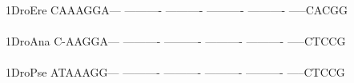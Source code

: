 \documentclass[11pt,twoside,reqno,a4paper]{article}
\begin{document}
{\hspace*{4\charwidth}\hspace*{7\charwidth}\hspace*{1\charwidth}\hspace*{1\charwidth}\hspace*{1\charwidth}\hspace*{1\charwidth}\hspace*{1\charwidth}\hspace*{1\charwidth}\\
1\hspace*{3\charwidth}DroEre	CAAAGGA---	----------	----------	----------	----------	-----CACGG	\\
\hspace*{4\charwidth}\hspace*{7\charwidth}\hspace*{1\charwidth}\hspace*{1\charwidth}\hspace*{1\charwidth}\hspace*{1\charwidth}\hspace*{1\charwidth}\hspace*{1\charwidth}\\
1\hspace*{3\charwidth}DroAna	C-AAGGA---	----------	----------	----------	----------	-----CTCCG	\\
\hspace*{4\charwidth}\hspace*{7\charwidth}\hspace*{1\charwidth}\hspace*{1\charwidth}\hspace*{1\charwidth}\hspace*{1\charwidth}\hspace*{1\charwidth}\hspace*{1\charwidth}\\
1\hspace*{3\charwidth}DroPse	ATAAAGG---	----------	----------	----------	----------	-----CTCCG	\\
\hspace*{4\charwidth}\hspace*{7\charwidth}\hspace*{1\charwidth}\hspace*{1\charwidth}\hspace*{1\charwidth}\hspace*{1\charwidth}\hspace*{1\charwidth}\hspace*{1\charwidth}\\
}
\end{document}
